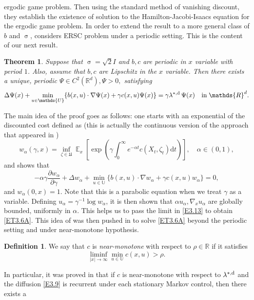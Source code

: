 \documentclass[notitlepage,11pt,reqno]{amsart}
\numberwithin{equation}{section}
\theoremstyle{plain}
\newtheorem{theorem}{Theorem}[section]
\theoremstyle{definition}
\newtheorem{definition}{Definition}[section]
\theoremstyle{remark}
\newcommand{\Act}{{\mathds{U}}}
\newcommand{\Uadm}{\mathfrak{U}}
\newcommand{\lamstrdf}{\lambda^{*,{\rm d}}}
\newcommand{\RR}{\mathds{R}} %
\newcommand{\Rd}{{\mathds{R}^{d}}}
\DeclareMathOperator{\Exp}{\mathbb{E}} %
\newcommand{\D}{\mathrm{d}} %
\newcommand{\grad}{\nabla}
\begin{document}
ergodic game problem. Then using the standard method of vanishing discount, they establish the existence of solution to the Hamilton-Jacobi-Isaacs equation for the ergodic game problem.
In order to extend the result to a more general class of $b$ and
$\upsigma$, \cite{MR2174017} considers ERSC problem 
under a periodic setting. This is the content of our next result.
\begin{theorem}
Suppose that $\upsigma=\sqrt{2}I$ and $b, c$ are periodic in 
$x$ variable with period $1$. Also, assume that $b, c$ are Lipschitz in the
$x$ variable. Then there exists a unique, periodic 
$\Psi\in C^2(\Rd), \Psi>0,$ satisfying 
\begin{equation}\label{ET3.6A}
\Delta \Psi(x) + \min_{u\in\Act}\{b(x, u)\cdot\grad\Psi(x) + 
\gamma c(x, u)\Psi(x)\}=\gamma\lamstrdf\,\Psi(x)\quad \text{in}\; \Rd.
\end{equation}
\end{theorem}
The main idea of the proof goes as follows: one starts with an
exponential of the discounted cost defined as (this is actually the continuous version of the approach that appeared in \cite{DiMasi-99b,MR1795349})
$$
w_\alpha(\gamma, x)=\inf_{\zeta\in\Uadm}
\Exp_x\left[\exp\left(\gamma\int_0^\infty e^{-\alpha t}
c(X_t, \zeta_t) \D{t}\right)\right], \quad \alpha\in (0, 1),
$$
and shows that
\begin{equation}\label{E3.13}
-\alpha\gamma\frac{\partial w_\alpha}{\partial \gamma}
+ \Delta w_\alpha + 
\min_{u\in\Act}\{b(x, u)\cdot\grad w_\alpha + \gamma c(x, u) w_\alpha\}=0,
\end{equation}
and $w_\alpha(0, x)=1$. Note that this is a parabolic equation
when we treat $\gamma$ as a variable. Defining 
$u_\alpha=\gamma^{-1}\log w_\alpha$, it is then shown that 
$\alpha u_\alpha, \grad_x u_\alpha$ are globally bounded, 
uniformly in $\alpha$. This helps us to pass the limit in
\eqref{E3.13} to obtain \eqref{ET3.6A}. This idea of \cite{MR2174017}
was then pushed in \cite{MR2727342,MR2679474,MR2679473} to
solve \eqref{ET3.6A} beyond the  periodic setting and under
near-monotone hypothesis.
\begin{definition}
We say that $c$ is {\it near-monotone} with respect to $\rho\in\RR$ 
if it satisfies
$$
\liminf_{|x|\to\infty} \min_{u\in\Act}c(x, u)>\rho.
$$
\end{definition}
In particular, it was proved in \cite{MR2679473} that if $c$ is near-monotone with respect to $\lamstrdf$ and the diffusion \eqref{E3.9} is
recurrent under each stationary Markov control, then there exists a 
\end{document}
